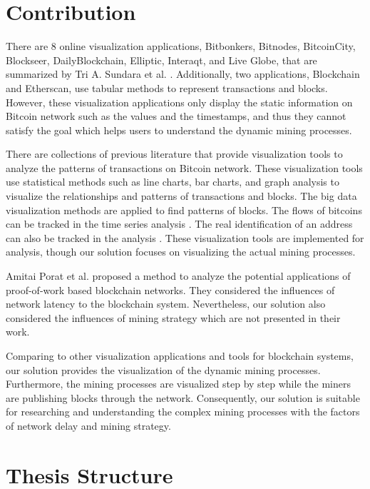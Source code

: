 \section{Contribution}

There are 8 online visualization applications, Bitbonkers, Bitnodes, BitcoinCity, Blockseer, DailyBlockchain, Elliptic, Interaqt, and Live Globe, that are summarized by Tri A. Sundara et al. \cite{Sundara2017}. Additionally, two applications, Blockchain and Etherscan, use tabular methods to represent transactions and blocks. However, these visualization applications only display the static information on Bitcoin network such as the values and the timestamps, and thus they cannot satisfy the goal which helps users to understand the dynamic mining processes. 

There are collections of previous literature that provide visualization tools to analyze the patterns of transactions on Bitcoin network. These visualization tools \cite{Kuzuno2017, Saublet2015, Fleder2015, Baumann2014} use statistical methods such as line charts, bar charts, and graph analysis to visualize the relationships and patterns of transactions and blocks. The big data visualization methods are applied \cite{McGinn2016} to find patterns of blocks. The flows of bitcoins can be tracked in the time series analysis \cite{Battista2015}. The real identification of an address can also be tracked in the analysis \cite{Kuzuno2017}. These visualization tools are implemented for analysis, though our solution focuses on visualizing the actual mining processes. 
 
Amitai Porat et al. \cite{Porat} proposed a method to analyze the potential applications of proof-of-work based blockchain networks. They considered the influences of network latency to the blockchain system. Nevertheless, our solution also considered the influences of mining strategy which are not presented in their work.

Comparing to other visualization applications and tools for blockchain systems, our solution provides the visualization of the dynamic mining processes. Furthermore, the mining processes are visualized step by step while the miners are publishing blocks through the network. Consequently, our solution is suitable for researching and understanding the complex mining processes with the factors of network delay and mining strategy.

\section{Thesis Structure}

